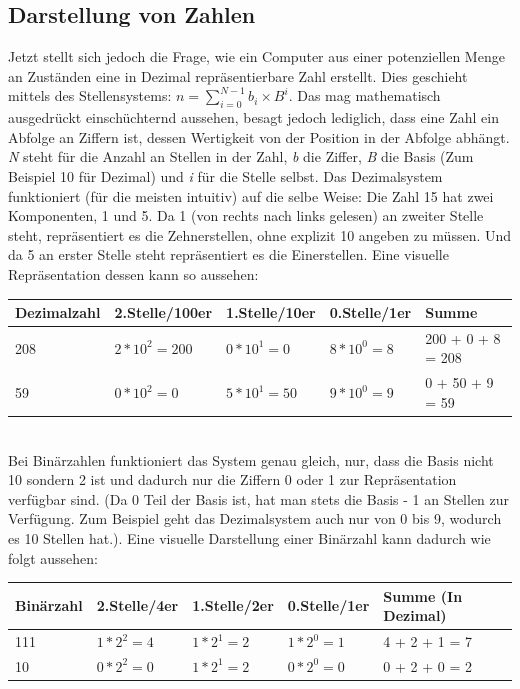 \documentclass{article}
\begin{document}
	\subsection{Darstellung von Zahlen}
	Jetzt stellt sich jedoch die Frage, wie ein Computer aus einer potenziellen Menge an Zuständen eine in Dezimal repräsentierbare Zahl erstellt. Dies geschieht mittels des Stellensystems: $n=\sum_{i=0}^{N-1}b_i\times B^i$. Das mag mathematisch ausgedrückt einschüchternd aussehen, besagt jedoch lediglich, dass eine Zahl ein Abfolge an Ziffern ist, dessen Wertigkeit von der Position in der Abfolge abhängt. \textit{N} steht für die Anzahl an Stellen in der Zahl, \textit{b} die Ziffer, \textit{B} die Basis (Zum Beispiel 10 für Dezimal) und \textit{i} für die Stelle selbst. Das Dezimalsystem funktioniert (für die meisten intuitiv) auf die selbe Weise: Die Zahl 15 hat zwei Komponenten, 1 und 5. Da 1 (von rechts nach links gelesen) an zweiter Stelle steht, repräsentiert es die Zehnerstellen, ohne explizit 10 angeben zu müssen. Und da 5 an erster Stelle steht repräsentiert es die Einerstellen. Eine visuelle Repräsentation dessen kann so aussehen: \\
	\begin{tabular}{| l | l | l | l | l |}
		\toprule
		Dezimalzahl & 2.Stelle/100er &1.Stelle/10er & 0.Stelle/1er & Summe \\ \midrule
		208 & $2*10^2=200$ & $0*10^1=0$ & $8*10^0=8$ & 200 + 0 + 8 = 208 \\ \hline
		59 & $0*10^2=0$ & $5*10^1=50$ & $9*10^0=9$ & 0 + 50 + 9 = 59 \\
		\bottomrule
	\end{tabular} \\
	Bei Binärzahlen funktioniert das System genau gleich, nur, dass die Basis nicht 10 sondern 2 ist und dadurch nur die Ziffern 0 oder 1 zur Repräsentation verfügbar sind. (Da 0 Teil der Basis ist, hat man stets die Basis - 1 an Stellen zur Verfügung. Zum Beispiel geht das Dezimalsystem auch nur von 0 bis 9, wodurch es 10 Stellen hat.). Eine visuelle Darstellung einer Binärzahl kann dadurch wie folgt aussehen: \\
	\begin{tabular}{| l | l | l | l | l |}
		\toprule
		Binärzahl & 2.Stelle/4er &1.Stelle/2er & 0.Stelle/1er & Summe (In Dezimal) \\ \midrule
		111 & $1*2^2=4$ & $1*2^1=2$ & $1*2^0=1$ & 4 + 2 + 1 = 7 \\ \hline
		10 & $0*2^2=0$ & $1*2^1=2$ & $0*2^0=0$ & 0 + 2 + 0 = 2 \\
		\bottomrule
	\end{tabular} \\
\end{document}
